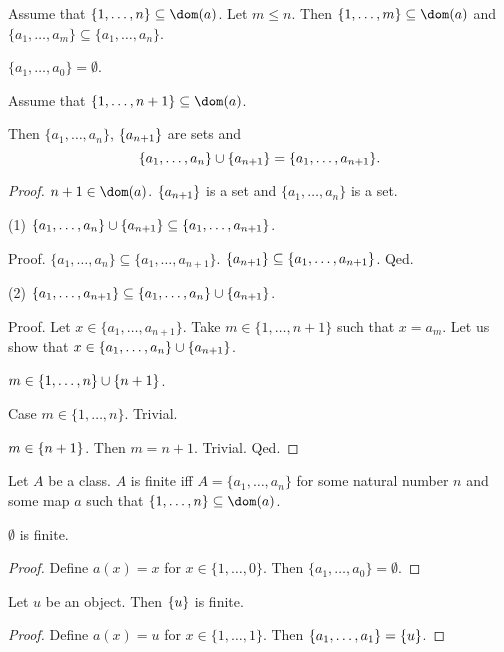 \documentclass[11pt]{article}
\newcommand{\Seq}[2]{\{#1,\dots,#2\}}
\newcommand{\FinSet}[3]{\{#1_{#2},\dots,#1_{#3}\}}
\begin{document}
\begin{forthel}
\begin{lemma}
Assume that $\Seq{1}{n} \subseteq \dom(a)$.
Let $m \leq n$. Then $\Seq{1}{m} \subseteq \dom(a)$ and
$\FinSet{a}{1}{m} \subseteq \FinSet{a}{1}{n}$.
\end{lemma}

\begin{lemma}
$\FinSet{a}{1}{0} = \emptyset$.
\end{lemma}

\begin{lemma}
Assume that $\Seq{1}{n+1} \subseteq \dom(a)$. 

Then
$\FinSet{a}{1}{n}$, $\{a_{n+1}\}$ are sets and
\[\FinSet{a}{1}{n} \cup \sing{a_{n+1}} = \FinSet{a}{1}{n+1}.\]
\end{lemma}
\begin{proof}
$n+1 \in \dom(a)$.
$\{a_{n+1}\}$ is a set and $\FinSet{a}{1}{n}$ is a set.

(1) $\FinSet{a}{1}{n} \cup \sing{a_{n+1}} \subseteq \FinSet{a}{1}{n+1}$.

Proof.
$\FinSet{a}{1}{n} \subseteq \FinSet{a}{1}{n+1}$.
$\sing{a_{n+1}}  \subseteq \FinSet{a}{1}{n+1}$.
Qed.

(2) $\FinSet{a}{1}{n+1} \subseteq \FinSet{a}{1}{n} \cup \sing{a_{n+1}}$.

Proof.
Let $x \in \FinSet{a}{1}{n+1}$. Take $m \in \Seq{1}{n+1}$ such that
$x = a_{m}$. Let us show that $x \in \FinSet{a}{1}{n} \cup \sing{a_{n+1}}$.

$m \in \Seq{1}{n} \cup \sing{n+1}$.

Case $m \in \Seq{1}{n}$. Trivial.

$m \in \{n+1\}$. Then $m = n+1$. Trivial.
Qed.

\end{proof}

\begin{definition} Let $A$ be a class.
$A$ is finite iff
$A = \FinSet{a}{1}{n}$ for some natural number $n$ and some map $a$ such 
that $\Seq{1}{n} \subseteq \dom(a)$.
\end{definition}

\begin{lemma}
$\emptyset$ is finite.
\end{lemma}
\begin{proof}
Define $a(x) = x$ for $x \in \Seq{1}{0}$.
Then $\FinSet{a}{1}{0} = \emptyset$.
\end{proof}

\begin{lemma}
Let $u$ be an object. Then
$\{u\}$ is finite.
\end{lemma}
\begin{proof}
Define $a(x) = u$ for $x \in \Seq{1}{1}$.
Then $\FinSet{a}{1}{1} = \sing{u}$. 
\end{proof}


\end{forthel}
\end{document}
